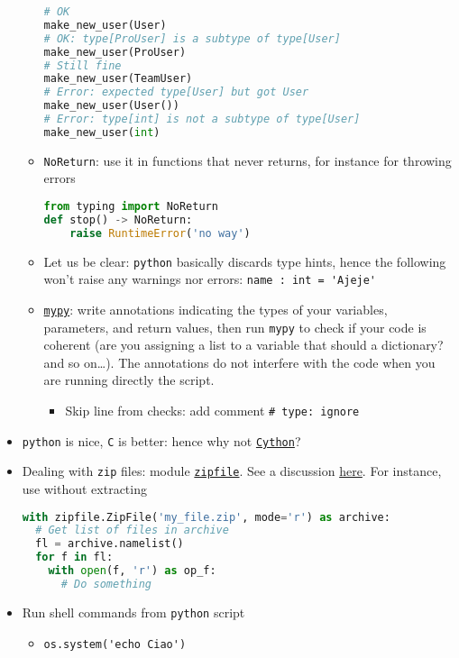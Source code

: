 \documentclass[a4paper,12pt,%
              final%
              ]{article}
\begin{document}
\begin{itemize}
\begin{itemize}
\begin{lstlisting}[language=python]
# OK
make_new_user(User)
# OK: type[ProUser] is a subtype of type[User]
make_new_user(ProUser)
# Still fine
make_new_user(TeamUser)
# Error: expected type[User] but got User
make_new_user(User())
# Error: type[int] is not a subtype of type[User]
make_new_user(int)
\end{lstlisting}
      \item \texttt{NoReturn}: use it in functions that never returns, for instance for throwing errors
\begin{lstlisting}[language=python]
from typing import NoReturn
def stop() -> NoReturn:
    raise RuntimeError('no way')
\end{lstlisting}
      \item Let us be clear: \texttt{python} basically discards type hints, hence the following won't raise any warnings nor errors: \verb|name : int = 'Ajeje'|
      \item \href{https://mypy.readthedocs.io/en/stable/index.html}{\texttt{mypy}}: write annotations indicating the types of your variables, parameters, and return values, then run \texttt{mypy} to check if your code is coherent (are you assigning a list to a variable that should a dictionary? and so on\ldots). The annotations do not interfere with the code when you are running directly the script.
        \begin{itemize}
          \item Skip line from checks: add comment \verb|# type: ignore|
        \end{itemize}
    \end{itemize}
  \item \texttt{python} is nice, \texttt{C} is better: hence why not \href{https://cython.readthedocs.io/en/latest/index.html}{\texttt{Cython}}?
  \item Dealing with \texttt{zip} files: module \href{https://docs.python.org/3/library/zipfile.html}{\texttt{zipfile}}. See a discussion \href{https://realpython.com/python-zipfile/}{here}. For instance, use without extracting
\begin{lstlisting}[language=python]
with zipfile.ZipFile('my_file.zip', mode='r') as archive:
  # Get list of files in archive
  fl = archive.namelist()
  for f in fl:
    with open(f, 'r') as op_f:
      # Do something
\end{lstlisting}
  \item Run shell commands from \texttt{python} script
    \begin{itemize}
      \item \verb|os.system('echo Ciao')|

\end{itemize}
\end{itemize}
\end{document}
